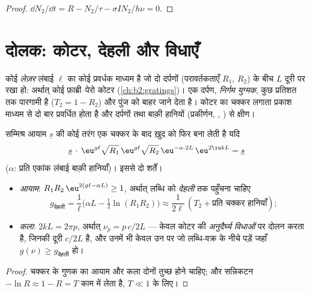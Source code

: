 \begin{proof}
$\dd N_2/\dd t = R - N_2/\tau - \sigma I N_2/h\nu = 0$.
\end{proof}

\section{दोलक: कोटर, देहली और विधाएँ}

\begin{definition}[लेज़र कोटर]\label{def:b2:laser:cavity}
कोई \emph{लेज़र} लंबाई $\ell$ का कोई प्रवर्धक माध्यम है
जो दो दर्पणों (परावर्तकताएँ $R_1$, $R_2$) के बीच $L$ दूरी पर
रखा हो: अर्थात् कोई फ़ाब्री--पेरो कोटर (\cref{ch:b2:gratings})। एक दर्पण,
\emph{निर्गम युग्मक}, कुछ प्रतिशत तक पारगामी है ($T_2 = 1 - R_2$)
और पुंज को बाहर जाने देता है। कोटर का चक्कर लगाता प्रकाश
माध्यम से दो बार प्रवर्धित होता है और दर्पणों तथा
बाक़ी हानियों (प्रकीर्णन, , ) से क्षीण।
\end{definition}

\begin{theorem}[दोलन की शर्त]\label{thm:b2:laser:threshold}
सम्मिश्र आयाम $\underline s$ की कोई तरंग एक चक्कर के बाद ख़ुद को फिर बना
लेती है यदि
\[
\underline s\,\cdot\, \eu^{g\ell}\sqrt{R_1}\,\eu^{g\ell}\sqrt{R_2}\,
\eu^{-\alpha\cdot 2L}\,\eu^{2\iu kL} = \underline s
\]
($\alpha$: प्रति एकांक लंबाई बाक़ी हानियाँ)। इससे दो शर्तें।
\begin{itemize}
\item \emph{आयाम}: $R_1R_2\,\eu^{2(g\ell - \alpha L)} \ge 1$, अर्थात्
      लब्धि को \emph{देहली} तक पहुँचना चाहिए
      \[
      g_{\text{देहली}} = \frac{1}{\ell}\Big(\alpha L - \tfrac12\ln(R_1R_2)\Big)
      \approx \frac{1}{2\ell}\,(T_2 + \text{प्रति चक्कर हानियाँ}) ;
      \]
\item \emph{कला}: $2kL = 2\pi p$, अर्थात् $\nu_p = p\,c/2L$ --- 
      केवल कोटर की \emph{अनुदैर्घ्य विधाओं} पर दोलन करता है, जिनकी दूरी $c/2L$ है, और उनमें भी केवल
      उन पर जो लब्धि-वक्र के नीचे पड़ें जहाँ $g(\nu) \ge g_{\text{देहली}}$ हो।
\end{itemize}
\end{theorem}

\begin{proof}
चक्कर के गुणक का आयाम और कला दोनों तुच्छ होने चाहिए; और
सन्निकटन $-\ln R \approx 1 - R = T$ काम में लेता है, $T \ll 1$ के लिए।
\end{proof}

